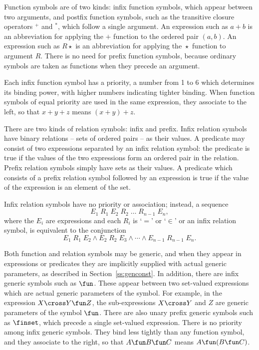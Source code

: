 Function symbols are of two kinds: infix function symbols, which
appear between two arguments, and postfix function symbols, such as
the transitive closure operators ${}^+$ and ${}^*$, which follow a
single argument.
An expression such as $a+b$ is an abbreviation for applying the $+$
function to the ordered pair $(a,b)$.
An expression such as $R\star$ is an abbreviation for applying the
${}\star$ function to argument $R$.
There is no need for prefix function
symbols, because ordinary symbols are taken as functions when they
precede an argument.

Each infix function symbol has a priority, a number from 1 to 6
which determines its binding power, with higher
numbers indicating tighter binding. When function symbols of equal
priority are used in the same expression, they
associate to the left, so that
$x + y + z$ means $(x + y) + z$.

There are two kinds of relation symbols:
infix and prefix.  Infix
relation symbols have binary relations -- sets of ordered pairs --
as their values.  A predicate may consist of two expressions
separated by an infix relation symbol: the predicate is true if the
values of the two expressions form an ordered pair in the relation.
Prefix relation symbols simply have sets as their values. A
predicate which consists of a prefix relation symbol followed by an
expression is true if the value of the expression is an element of
the set.

Infix relation symbols have no priority or association; instead, a sequence
\[ E_1\;R_1\;E_2\;R_2\;\ldots\;R_{n\minus1}\;E_n, \]
where the $E_i$ are expressions and each $R_i$ is `$=$' or `$\in$'
or an infix relation symbol, is equivalent to the conjunction
\[ E_1\;R_1\;E_2 \land E_2\;R_2\;E_3 \land \cdots
                \land E_{n\minus1}\;R_{n\minus1}\;E_n. \]

Both function and relation symbols may be generic, and when they appear
in expressions or predicates they are implicitly supplied with
actual generic parameters, as described in Section~\ref{ss:genconst}.
In addition, there are infix generic symbols such as $\fun$.
These appear between two set-valued expressions which are actual generic
parameters of the symbol.
For example, in the expression $X \cross Y \fun Z$, the sub-expressions
$X \cross Y$ and $Z$ are generic parameters of the symbol $\fun$.
There are also unary prefix generic
symbols such as $\finset$, which precede a single set-valued expression.
There is no priority among infix generic symbols. They bind less tightly
than any function symbol, and they associate to the right, so
that $A \fun B \fun C$ means $A \fun (B \fun C)$.

